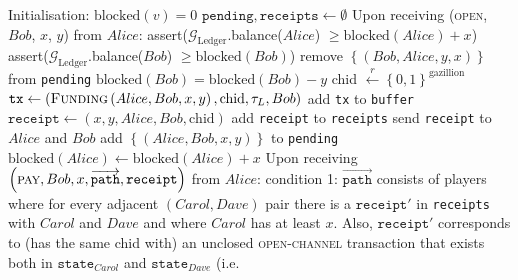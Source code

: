 \begin{algorithm}
  \caption{$\mathcal{F}_{\mathrm{PayNet}}$}
  \label{alg:payfunc}
  \begin{algorithmic}[1]
    \State Initialisation:
      \Indent
        \State $\mathrm{blocked}\left(v\right) = 0$
      \EndFor
      \State $\mathtt{pending}, \mathtt{receipts} \gets \emptyset$
      \EndIndent
    \State
    \State Upon receiving (\textsc{open}, $Bob$, $x$, $y$) from $Alice$:
    \Indent
        \State assert($\mathcal{G}_{\mathrm{Ledger}}$.balance($Alice$) $\geq
        \mathrm{blocked}\left(Alice\right) + x$)
        \State assert($\mathcal{G}_{\mathrm{Ledger}}$.balance($Bob$) $\geq
        \mathrm{blocked}\left(Bob\right)$)
        \State remove $\left\{\left(Bob, Alice, y, x\right)\right\}$ from
        \texttt{pending}
        \State $\mathrm{blocked}\left(Bob\right) = \mathrm{blocked}\left(Bob\right) - y$
        \State chid $\overset{r}{\leftarrow} \left\{0, 1\right\}^{\mathrm{gazillion}}$
        \State $\mathtt{tx} \gets \left(\textsc{Funding}\left(Alice, Bob, x, y\right),
        \mathrm{chid}, \tau_L, Bob\right)$
        \State add \texttt{tx} to \texttt{buffer}
        \State $\mathtt{receipt} \gets \left(x, y, Alice, Bob,
        \mathrm{chid}\right)$
        \State add \texttt{receipt} to \texttt{receipts}
        \State send \texttt{receipt} to $Alice$ and $Bob$
      \Else
        \State add $\left\{\left(Alice, Bob, x, y\right)\right\}$ to
        \texttt{pending}
        \State $\mathrm{blocked}\left(Alice\right) \leftarrow
        \mathrm{blocked}\left(Alice\right) + x$
      \EndIf
    \EndIndent
    \State
    \State Upon receiving $\left(\textsc{pay}, Bob, x,
    \overrightarrow{\mathtt{path}}, \mathtt{receipt}\right)$ from $Alice$:
    \Indent
      \State condition 1: $\overrightarrow{\mathtt{path}}$ consists of players
      where for every adjacent $\left(Carol, Dave\right)$ pair there is a
      $\mathtt{receipt}'$ in \texttt{receipts} with $Carol$ and $Dave$ and where
      $Carol$ has at least $x$. Also, $\mathtt{receipt}'$ corresponds to (has
      the same chid with) an unclosed \textsc{open-channel} transaction that
      exists both in $\mathtt{state}_{Carol}$ and $\mathtt{state}_{Dave}$ (i.e.

\end{algorithmic}
\end{algorithm}
